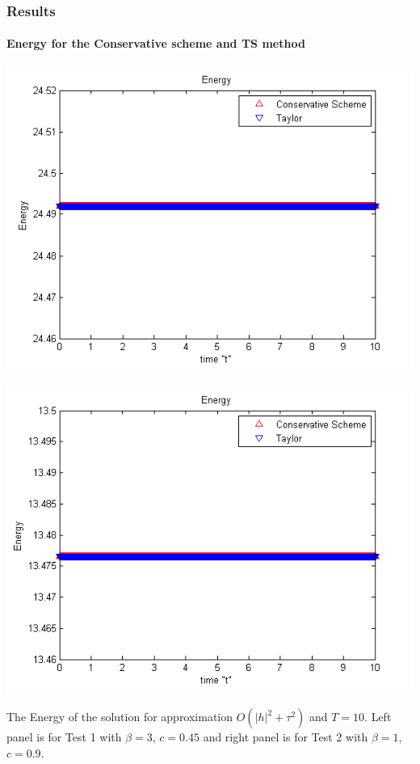\documentclass{beamer}
\begin{document}
\begin{frame}
\frametitle{Results}
\framesubtitle{Energy for the Conservative scheme and TS method}

\begin{center}\vspace{0.4cm}
	\begin{minipage}[b]{0.49\linewidth}
		\includegraphics[width=\linewidth]{figures/Energy_bt3_c045_h005.png}
	\end{minipage}	
	\begin{minipage}[b]{0.49\linewidth}
		\includegraphics[width=\linewidth]{figures/Energy_bt1_c090_h010.png}
		
	\end{minipage}
\end{center}
The Energy of the solution for approximation $O(|h|^2 + \tau^2)$ and $T = 10$. Left panel is for Test 1 with $\beta=3$, $c = 0.45$ and right panel is for Test 2 with $\beta=1$, $c = 0.9$.
\end{frame}
\end{document}
